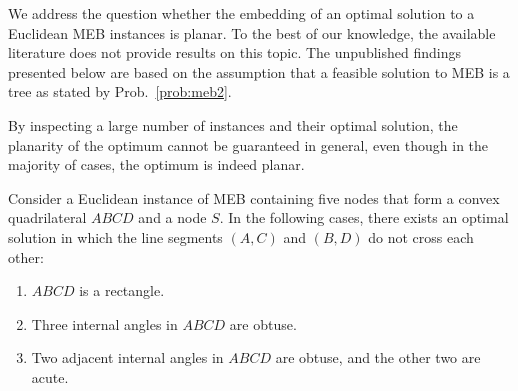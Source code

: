 We address the question whether the embedding of an optimal solution to a Euclidean MEB instances is planar.
To the best of our knowledge, the available literature does not provide results on this topic.
The unpublished findings presented below are based on the assumption that a feasible solution to MEB is a tree as stated by Prob.~\ref{prob:meb2}.

By inspecting a large number of instances and their optimal solution, the planarity of the optimum cannot be guaranteed in general, even though in the majority of cases, the optimum is indeed planar.
\begin{proposition}\label{prop:mebplan}
Consider a Euclidean instance of MEB containing five nodes that form a convex quadrilateral $ABCD$ and a node $S$.
In the following cases, there exists an optimal solution in which the line segments $(A,C)$ and $(B,D)$ do not cross each other:
	\begin{enumerate}
		\item $ABCD$ is a rectangle.
		\item Three internal angles in $ABCD$ are obtuse.
		\item Two adjacent internal angles in $ABCD$ are obtuse, and the other two are acute.
	\end{enumerate}
\end{proposition}
